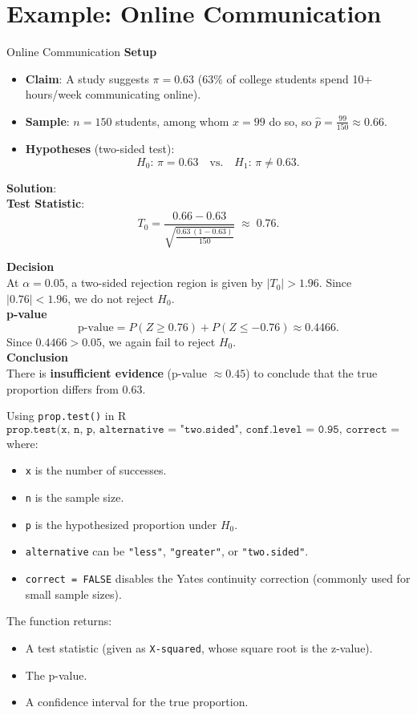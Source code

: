 \documentclass[10pt]{extarticle}
\begin{document}
\section{Example: Online Communication}
\begin{examplebox}{Online Communication}{}
    \textbf{Setup}
\begin{itemize}
    \item \textbf{Claim}: A study suggests $\pi = 0.63$ (63\% of college students spend 10+ hours/week communicating online).
    \item \textbf{Sample}: $n=150$ students, among whom $x=99$ do so, so $\hat{p} = \frac{99}{150} \approx 0.66$.
    \item \textbf{Hypotheses} (two-sided test):
    $$
    H_0:\,\pi=0.63 \quad\text{vs.}\quad H_1:\,\pi\neq0.63.
    $$
    \end{itemize}
    \textbf{Solution}:\\
    \textbf{Test Statistic}:
    $$
    T_0 = \frac{0.66 - 0.63}{\sqrt{\frac{0.63\,(1-0.63)}{150}}} \;\approx\; 0.76.
    $$

    \textbf{Decision} \\
    At $\alpha=0.05$, a two-sided rejection region is given by $\lvert T_0 \rvert > 1.96$. Since $\lvert0.76\rvert < 1.96$, we do not reject $H_0$. \\[1.5ex]

    \textbf{p-value}
    $$
    \text{p-value} = P(Z \ge 0.76) + P(Z \le -0.76) \approx 0.4466.
    $$
    Since $0.4466 > 0.05$, we again fail to reject $H_0$.\\[1.5ex]

    \textbf{Conclusion} \\
    There is \textbf{insufficient evidence} (p-value $\approx 0.45$) to conclude that the true proportion differs from 0.63.
\end{examplebox}

\begin{conceptbox}{Using \texttt{prop.test()} in R}{}
$$\texttt{prop.test(x, n, p, alternative = "two.sided", conf.level = 0.95, correct = FALSE)}$$
where:
\begin{itemize}
    \item \texttt{x} is the number of successes.
    \item \texttt{n} is the sample size.
    \item \texttt{p} is the hypothesized proportion under $H_0$.
    \item \texttt{alternative} can be \texttt{"less"}, \texttt{"greater"}, or \texttt{"two.sided"}.
    \item \texttt{correct = FALSE} disables the Yates continuity correction (commonly used for small sample sizes).
\end{itemize}
The function returns:
\begin{itemize}
    \item A test statistic (given as \texttt{X-squared}, whose square root is the z-value).
    \item The p-value.
    \item A confidence interval for the true proportion.
\end{itemize}
\end{conceptbox}
\end{document}
